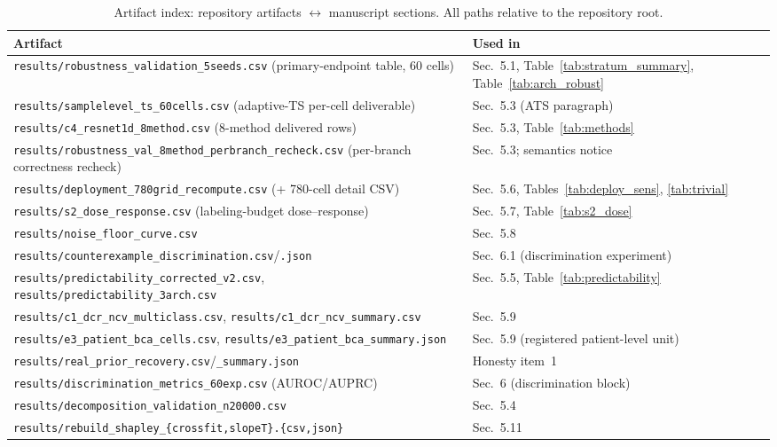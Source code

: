 \documentclass[review,12pt,nonatbib]{elsarticle}
\begin{document}
\begin{table}[tb]
\centering
\caption{Artifact index: repository artifacts $\leftrightarrow$
manuscript sections. All paths relative to the repository root.}
\label{tab:artifact-index}
\footnotesize
\begin{tabular}{p{}p{}}
\toprule
Artifact & Used in \\
\midrule
\texttt{results/robustness\_validation\_5seeds.csv} (primary-endpoint table, 60 cells) & Sec.~5.1, Table~\ref{tab:stratum_summary}, Table~\ref{tab:arch_robust} \\
\texttt{results/samplelevel\_ts\_60cells.csv} (adaptive-TS per-cell deliverable) & Sec.~5.3 (ATS paragraph) \\
\texttt{results/c4\_resnet1d\_8method.csv} (8-method delivered rows) & Sec.~5.3, Table~\ref{tab:methods} \\
\texttt{results/robustness\_val\_8method\_perbranch\_recheck.csv} (per-branch correctness recheck) & Sec.~5.3; semantics notice \\
\texttt{results/deployment\_780grid\_recompute.csv} (+ 780-cell detail CSV) & Sec.~5.6, Tables~\ref{tab:deploy_sens}, \ref{tab:trivial} \\
\texttt{results/s2\_dose\_response.csv} (labeling-budget dose--response) & Sec.~5.7, Table~\ref{tab:s2_dose} \\
\texttt{results/noise\_floor\_curve.csv} & Sec.~5.8 \\
\texttt{results/counterexample\_discrimination.csv}/\texttt{.json} & Sec.~6.1 (discrimination experiment) \\
\texttt{results/predictability\_corrected\_v2.csv}, \texttt{results/predictability\_3arch.csv} & Sec.~5.5, Table~\ref{tab:predictability} \\
\texttt{results/c1\_dcr\_ncv\_multiclass.csv}, \texttt{results/c1\_dcr\_ncv\_summary.csv} & Sec.~5.9 \\
\texttt{results/e3\_patient\_bca\_cells.csv}, \texttt{results/e3\_patient\_bca\_summary.json} & Sec.~5.9 (registered patient-level unit) \\
\texttt{results/real\_prior\_recovery.csv}/\texttt{\_summary.json} & Honesty item~1 \\
\texttt{results/discrimination\_metrics\_60exp.csv} (AUROC/AUPRC) & Sec.~6 (discrimination block) \\
\texttt{results/decomposition\_validation\_n20000.csv} & Sec.~5.4 \\
\texttt{results/rebuild\_shapley\_\{crossfit,slopeT\}.\{csv,json\}} & Sec.~5.11 \\

\end{tabular}
\end{table}
\end{document}
